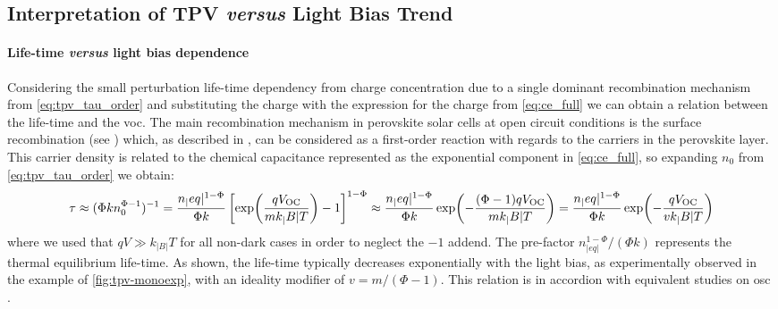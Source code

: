 	\subsection{Interpretation of TPV \textsl{versus} Light Bias Trend}

		\paragraph{Life\hyp{}time \textsl{versus} light bias dependence}\label{tpv_tau_vs_intensity}
		Considering the small perturbation life\hyp{}time dependency from charge concentration due to a single dominant recombination mechanism from \cref{eq:tpv_tau_order} and substituting the charge with the expression for the charge from \cref{eq:ce_full} we can obtain a relation between the life\hyp{}time and the \gls{voc}.
		The main recombination mechanism in perovskite solar cells at open circuit conditions is the surface recombination (see ) which, as described in , can be considered as a first\hyp{}order reaction with regards to the carriers \label{tpv_chemical_charge}in the perovskite layer.
		This carrier density is related to the chemical capacitance represented as the exponential component in \cref{eq:ce_full}, so expanding $n_0$ from \cref{eq:tpv_tau_order} we obtain:
		\begin{dmath}\label{eq:tpv_tau_vs_intensity}
			\tau \approx (\Phi k n_0^{\Phi-1})^{-1} = \frac{n_|eq|^{1-\Phi}}{\Phi k} \left[\exp(\frac{q\voc}{mk_|B|T}) - 1\right]^{1-\Phi} \approx \frac{n_|eq|^{1-\Phi}}{\Phi k} \exp(-\frac{(\Phi-1)q\voc}{mk_|B|T}) = \frac{n_|eq|^{1-\Phi}}{\Phi k} \exp(-\frac{q\voc}{vk_|B|T})
		\end{dmath}
		where we used that $qV \gg k_|B|T$ for all non-dark cases in order to neglect the $-1$ addend.
		The pre\hyp{}factor $n_|eq|^{1-\Phi}/(\Phi k)$ represents the thermal equilibrium life\hyp{}time.
		As shown, the life\hyp{}time typically decreases exponentially with the light bias, as experimentally observed in the example of \cref{fig:tpv-monoexp}, with an ideality modifier of $v = m/(\Phi-1)$.
		This relation is in accordion with equivalent studies on \gls{osc} \cite{Shuttle2008,Shuttle2008d,Credgington2011}.

